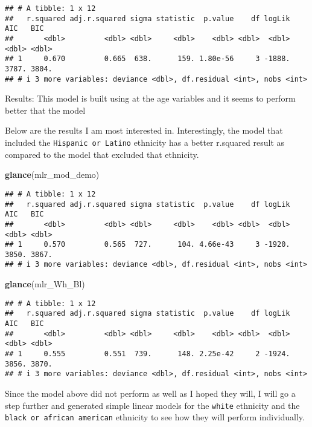 \documentclass[
]{article}
\newenvironment{Shaded}{\begin{snugshade}}{\end{snugshade}}
\newcommand{\FunctionTok}[1]{\textcolor[rgb]{0.13,0.29,0.53}{\textbf{#1}}}
\newcommand{\NormalTok}[1]{#1}
\begin{document}
\begin{verbatim}
## # A tibble: 1 x 12
##   r.squared adj.r.squared sigma statistic  p.value    df logLik   AIC   BIC
##       <dbl>         <dbl> <dbl>     <dbl>    <dbl> <dbl>  <dbl> <dbl> <dbl>
## 1     0.670         0.665  638.      159. 1.80e-56     3 -1888. 3787. 3804.
## # i 3 more variables: deviance <dbl>, df.residual <int>, nobs <int>
\end{verbatim}

Results: This model is built using at the age variables and it seems to
perform better that the model

Below are the results I am most interested in. Interestingly, the model
that included the \texttt{Hispanic\ or\ Latino} ethnicity has a better
r.squared result as compared to the model that excluded that ethnicity.

\begin{Shaded}
\begin{Highlighting}[]
\FunctionTok{glance}\NormalTok{(mlr\_mod\_demo)}
\end{Highlighting}
\end{Shaded}

\begin{verbatim}
## # A tibble: 1 x 12
##   r.squared adj.r.squared sigma statistic  p.value    df logLik   AIC   BIC
##       <dbl>         <dbl> <dbl>     <dbl>    <dbl> <dbl>  <dbl> <dbl> <dbl>
## 1     0.570         0.565  727.      104. 4.66e-43     3 -1920. 3850. 3867.
## # i 3 more variables: deviance <dbl>, df.residual <int>, nobs <int>
\end{verbatim}

\begin{Shaded}
\begin{Highlighting}[]
\FunctionTok{glance}\NormalTok{(mlr\_Wh\_Bl)}
\end{Highlighting}
\end{Shaded}

\begin{verbatim}
## # A tibble: 1 x 12
##   r.squared adj.r.squared sigma statistic  p.value    df logLik   AIC   BIC
##       <dbl>         <dbl> <dbl>     <dbl>    <dbl> <dbl>  <dbl> <dbl> <dbl>
## 1     0.555         0.551  739.      148. 2.25e-42     2 -1924. 3856. 3870.
## # i 3 more variables: deviance <dbl>, df.residual <int>, nobs <int>
\end{verbatim}

Since the model above did not perform as well as I hoped they will, I
will go a step further and generated simple linear models for the
\texttt{white} ethnicity and the \texttt{black\ or\ african\ american}
ethnicity to see how they will perform individually.
\end{document}
